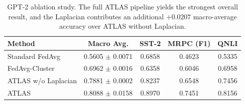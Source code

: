 \begin{table}[t]
\centering
\caption{GPT-2 ablation study. The full ATLAS pipeline yields the strongest overall result, and the Laplacian contributes an additional $+0.0207$ macro-average accuracy over ATLAS without Laplacian.}
\label{tab:ablation_deltas}
\begin{tabular}{lcccc}
\toprule
\textbf{Method} & \textbf{Macro Avg.} & \textbf{SST-2} & \textbf{MRPC (F1)} & \textbf{QNLI} \\
\midrule
Standard FedAvg & 0.5605 $\pm$ 0.0071 & 0.6858 & 0.4623 & 0.5335 \\
FedAvg-Cluster & 0.6962 $\pm$ 0.0016 & 0.6358 & 0.6046 & 0.6958 \\
ATLAS w/o Laplacian & 0.7881 $\pm$ 0.0002 & 0.8237 & 0.6548 & 0.7456 \\
ATLAS & 0.8088 $\pm$ 0.0158 & 0.8970 & 0.7451 & 0.8156 \\
\bottomrule
\end{tabular}
\end{table}
